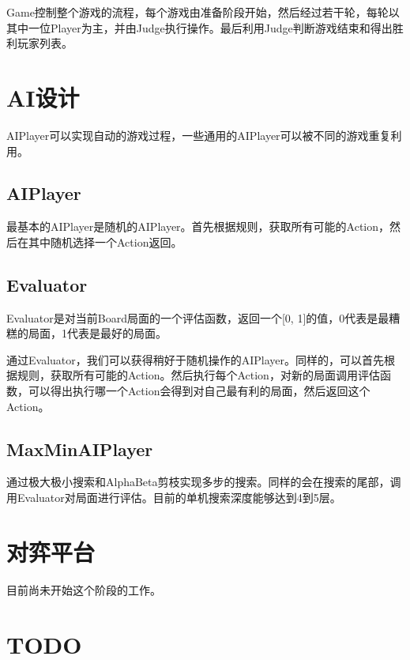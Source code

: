 \documentclass[export, 12pt, letterpaper]{ctexrep}
\begin{document}
Game控制整个游戏的流程，每个游戏由准备阶段开始，然后经过若干轮，每轮以其中一位Player为主，并由Judge执行操作。最后利用Judge判断游戏结束和得出胜利玩家列表。



\chapter{AI设计}

AIPlayer可以实现自动的游戏过程，一些通用的AIPlayer可以被不同的游戏重复利用。


\section{AIPlayer}
最基本的AIPlayer是随机的AIPlayer。首先根据规则，获取所有可能的Action，然后在其中随机选择一个Action返回。


\section{Evaluator}

Evaluator是对当前Board局面的一个评估函数，返回一个[0, 1]的值，0代表是最糟糕的局面，1代表是最好的局面。

通过Evaluator，我们可以获得稍好于随机操作的AIPlayer。同样的，可以首先根据规则，获取所有可能的Action。然后执行每个Action，对新的局面调用评估函数，可以得出执行哪一个Action会得到对自己最有利的局面，然后返回这个Action。

\section{MaxMinAIPlayer}

通过极大极小搜索和AlphaBeta剪枝实现多步的搜索。同样的会在搜索的尾部，调用Evaluator对局面进行评估。目前的单机搜索深度能够达到4到5层。

\chapter{对弈平台}

目前尚未开始这个阶段的工作。

\chapter{TODO}
\end{document}
